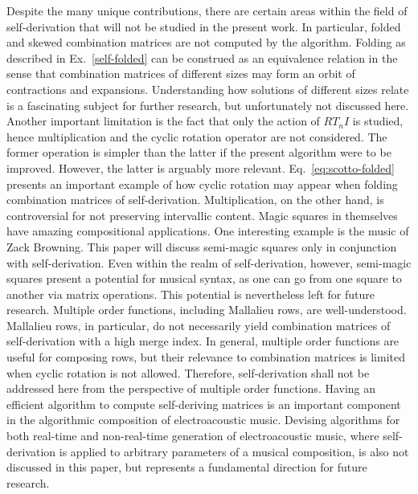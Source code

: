 Despite the many unique contributions, there are certain areas within the field of self-derivation that will not be studied in the present work. In particular, folded and skewed combination matrices are not computed by the algorithm. Folding as described in Ex.~\ref{self-folded} can be construed as an equivalence relation in the sense that combination matrices of different sizes may form an orbit of contractions and expansions. Understanding how solutions of different sizes relate is a fascinating subject for further research, but unfortunately not discussed here. Another important limitation is the fact that only the action of $RT_nI$ is studied, hence multiplication and the cyclic rotation operator are not considered. The former operation is simpler than the latter if the present algorithm were to be improved. However, the latter is arguably more relevant. Eq.~\ref{eq:scotto-folded} presents an important example of how cyclic rotation may appear when folding combination matrices of self-derivation. Multiplication, on the other hand, is controversial for not preserving intervallic content. Magic squares in themselves have amazing compositional applications. One interesting example is the music of Zack Browning. This paper will discuss semi-magic squares only in conjunction with self-derivation. Even within the realm of self-derivation, however, semi-magic squares present a potential for musical syntax, as one can go from one square to another via matrix operations. This potential is nevertheless left for future research. Multiple order functions, including Mallalieu rows, are well-understood. Mallalieu rows, in particular, do not necessarily yield combination matrices of self-derivation with a high merge index. In general, multiple order functions are useful for composing rows, but their relevance to combination matrices is limited when cyclic rotation is not allowed. Therefore, self-derivation shall not be addressed here from the perspective of multiple order functions. Having an efficient algorithm to compute self-deriving matrices is an important component in the algorithmic composition of electroacoustic music. Devising algorithms for both real-time and non-real-time generation of electroacoustic music, where self-derivation is applied to arbitrary parameters of a musical composition, is also not discussed in this paper, but represents a fundamental direction for future research.

